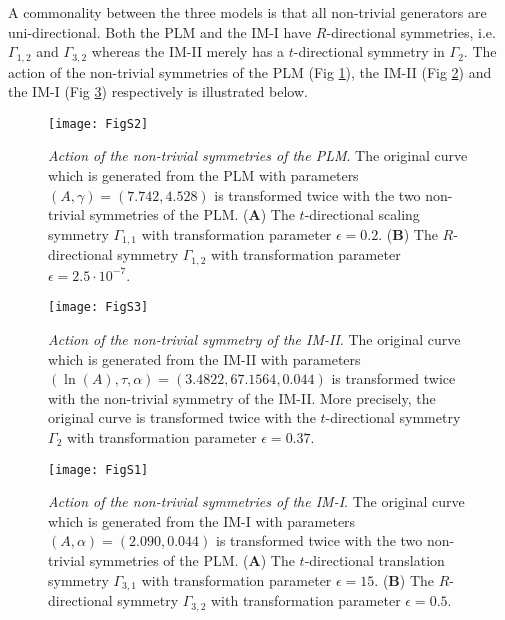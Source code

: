 A commonality between the three models is that all non-trivial generators are uni-directional. Both the PLM and the IM-I have $R$-directional symmetries, i.e. $\Gamma_{1,2}$ and $\Gamma_{3,2}$ whereas the IM-II
 merely has a $t$-directional symmetry in $\Gamma_{2}$. The action of the non-trivial symmetries of the PLM (Fig \ref{fig:PLM}), the IM-II (Fig \ref{fig:IM-II}) and the IM-I (Fig \ref{fig:IM-I}) respectively is illustrated below.

\begin{figure}[htbp!]
\texttt{[image: FigS2]}
\caption[Action of the non-trivial symmetries of the PLM]{\textit{Action of the non-trivial symmetries of the PLM}. The original curve which is generated from the PLM with parameters $(A,\gamma)=(7.742,4.528)$ is transformed twice with the two non-trivial symmetries of the PLM. (\textbf{A}) The $t$-directional scaling symmetry $\Gamma_{1,1}$ with transformation parameter $\epsilon=0.2$. (\textbf{B}) The $R$-directional symmetry $\Gamma_{1,2}$ with transformation parameter $\epsilon=2.5\cdot 10^{-7}$.}
\label{fig:PLM}
\end{figure}

\begin{figure}[htbp!]
\texttt{[image: FigS3]}
\caption[Action of the non-trivial symmetry of the IM-II]{\textit{Action of the non-trivial symmetry of the IM-II}. The original curve which is generated from the IM-II with parameters $(\ln(A),\tau,\alpha)=(3.4822,67.1564,0.044)$ is transformed twice with the non-trivial symmetry of the IM-II. More precisely, the original curve is transformed twice with the $t$-directional symmetry $\Gamma_{2}$ with transformation parameter $\epsilon=0.37$.}
\label{fig:IM-II}
\end{figure}




\begin{figure}[htbp!]
\texttt{[image: FigS1]}
\caption[Action of the non-trivial symmetries of the IM-I]{\textit{Action of the non-trivial symmetries of the IM-I}. The original curve which is generated from the IM-I with parameters $(A,\alpha)=(2.090,0.044)$ is transformed twice with the two non-trivial symmetries of the PLM. (\textbf{A}) The $t$-directional translation symmetry $\Gamma_{3,1}$ with transformation parameter $\epsilon=15$. (\textbf{B}) The $R$-directional symmetry $\Gamma_{3,2}$ with transformation parameter $\epsilon=0.5$.}
\label{fig:IM-I}
\end{figure}